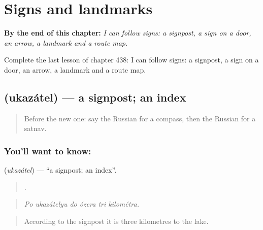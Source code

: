 
\chapter{Signs and landmarks}
\label{ch:ru-signs-and-landmarks}

\begin{chapteropening}
\textbf{By the end of this chapter:} \emph{I can follow signs: a signpost, a sign on a door, an arrow, a landmark and a route map.}

Complete the last lesson of chapter 438: I can follow signs: a signpost, a sign on a door, an arrow, a landmark and a route map.
\end{chapteropening}

\section[\texorpdfstring{\ru{указатель} (ukazátel)}{указатель (ukazátel)}]{ (ukazátel) — a signpost; an index}

\label{lesson:RU-C438-ukazatel}



\begin{quote}
Before the new one: say the Russian for a compass, then the Russian for a satnav.
\end{quote}

\subsection*{You'll want to know: }
\textbf{} (\emph{ukazátel}) — \textquotedblleft{}a signpost; an index\textquotedblright{}.

\begin{quote}
     .
\end{quote}

\begin{quote}
\emph{Po ukazátelyu do ózera tri kilométra.}
\end{quote}

\begin{quote}
According to the signpost it is three kilometres to the lake.
\end{quote}

